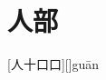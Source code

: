 \chapter{人部}

\begin{Lemma} %
	[人十口口][]{gu\=an}{}
	\pro{}\lipsum
	\begin{mainenum}
		\mitem  \en{}
		\E{\e \e \e }
		\mitem  \en{}
		\E{\e \e \e }
		\mitem  \en{}
		\E{\e \e \e }
	\end{mainenum}
\end{Lemma}







